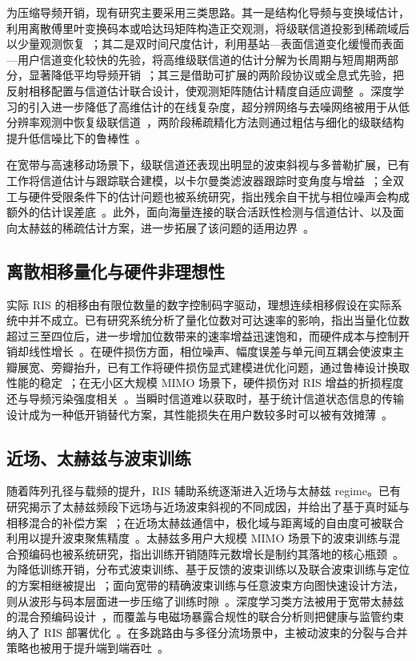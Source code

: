 为压缩导频开销，现有研究主要采用三类思路。其一是结构化导频与变换域估计，利用离散傅里叶变换码本或哈达玛矩阵构造正交观测，将级联信道投影到稀疏域后以少量观测恢复~\cite{hongyun2024ris}；其二是双时间尺度估计，利用基站—表面信道变化缓慢而表面—用户信道变化较快的先验，将高维级联信道的估计分解为长周期与短周期两部分，显著降低平均导频开销~\cite{hu2021ris}；其三是借助可扩展的两阶段协议或全息式先验，把反射相移配置与信道估计联合设计，使观测矩阵随估计精度自适应调整~\cite{an2022ris}。深度学习的引入进一步降低了高维估计的在线复杂度，超分辨网络与去噪网络被用于从低分辨率观测中恢复级联信道~\cite{shen2023ris}，两阶段稀疏精化方法则通过粗估与细化的级联结构提升低信噪比下的鲁棒性~\cite{ma2026ris}。

在宽带与高速移动场景下，级联信道还表现出明显的波束斜视与多普勒扩展，已有工作将信道估计与跟踪联合建模，以卡尔曼类滤波器跟踪时变角度与增益~\cite{zhang2025ris}；全双工与硬件受限条件下的估计问题也被系统研究，指出残余自干扰与相位噪声会构成额外的估计误差底~\cite{fernandes2023ris}。此外，面向海量连接的联合活跃性检测与信道估计、以及面向太赫兹的稀疏估计方案，进一步拓展了该问题的适用边界~\cite{xia2021ris,yang2025ris}。

\subsection{离散相移量化与硬件非理想性}

实际 RIS 的相移由有限位数量的数字控制码字驱动，理想连续相移假设在实际系统中并不成立。已有研究系统分析了量化位数对可达速率的影响，指出当量化位数超过三至四位后，进一步增加位数带来的速率增益迅速饱和，而硬件成本与控制开销却线性增长~\cite{boulogeorgos2020ris}。在硬件损伤方面，相位噪声、幅度误差与单元间互耦会使波束主瓣展宽、旁瓣抬升，已有工作将硬件损伤显式建模进优化问题，通过鲁棒设计换取性能的稳定~\cite{chen2025ris}；在无小区大规模 MIMO 场景下，硬件损伤对 RIS 增益的折损程度还与导频污染强度相关~\cite{zhang2023ris}。当瞬时信道难以获取时，基于统计信道状态信息的传输设计成为一种低开销替代方案，其性能损失在用户数较多时可以被有效摊薄~\cite{dai2022ris}。

\subsection{近场、太赫兹与波束训练}

随着阵列孔径与载频的提升，RIS 辅助系统逐渐进入近场与太赫兹 regime。已有研究揭示了太赫兹频段下远场与近场波束斜视的不同成因，并给出了基于真时延与相移混合的补偿方案~\cite{hao2023ris}；在近场太赫兹通信中，极化域与距离域的自由度可被联合利用以提升波束聚焦精度~\cite{qiu2026ris}。太赫兹多用户大规模 MIMO 场景下的波束训练与混合预编码也被系统研究，指出训练开销随阵元数增长是制约其落地的核心瓶颈~\cite{ning2021ris}。为降低训练开销，分布式波束训练、基于反馈的波束训练以及联合波束训练与定位的方案相继被提出~\cite{mei2021ris,cao2023ris,wang2021ris}；面向宽带的精确波束训练与任意波束方向图快速设计方法，则从波形与码本层面进一步压缩了训练时隙~\cite{chen2023ris,dang2023ris}。深度学习类方法被用于宽带太赫兹的混合预编码设计~\cite{yuan2024ris}，而覆盖与电磁场暴露合规性的联合分析则把健康与监管约束纳入了 RIS 部署优化~\cite{melhem2025ris}。在多跳路由与多径分流场景中，主被动波束的分裂与合并策略也被用于提升端到端吞吐~\cite{mei2022ris}。

